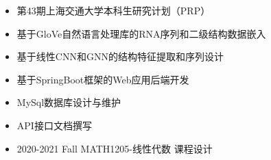 \documentclass{resume}
\begin{document}
\begin{itemize}[parsep=0.5ex]
  \item 第43期上海交通大学本科生研究计划（PRP）
  \item 基于GloVe自然语言处理库的RNA序列和二级结构数据嵌入
  \item 基于线性CNN和GNN的结构特征提取和序列设计
\end{itemize}

\begin{itemize}[parsep=0.5ex]
  \item 基于SpringBoot框架的Web应用后端开发
  \item MySql数据库设计与维护
  \item API接口文档撰写
\end{itemize}


\begin{itemize}[parsep=0.5ex]
  \item 2020-2021 Fall MATH1205-线性代数 课程设计
\end{itemize}


\end{document}
